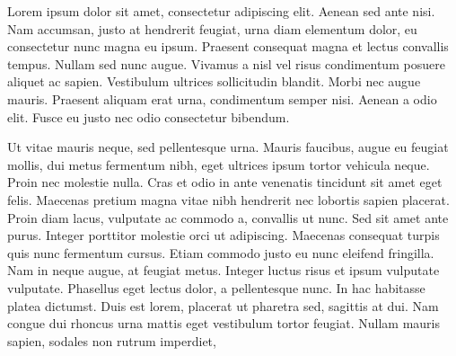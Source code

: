 \documentclass{minimal}
\begin{document}

Lorem ipsum dolor sit amet, consectetur adipiscing elit. Aenean sed ante nisi.
Nam accumsan, justo at hendrerit feugiat, urna diam elementum dolor, eu
consectetur nunc magna eu ipsum. Praesent consequat magna et lectus convallis
tempus. Nullam sed nunc augue. Vivamus a nisl vel risus condimentum posuere
aliquet ac sapien. Vestibulum ultrices sollicitudin blandit. Morbi nec augue
mauris. Praesent aliquam erat urna, condimentum semper nisi. Aenean a odio
elit. Fusce eu justo nec odio consectetur bibendum.

\renewcommand{\baselinestretch}{1.50}\normalsize

Ut vitae mauris neque, sed pellentesque urna. Mauris faucibus, augue eu
feugiat mollis, dui metus fermentum nibh, eget ultrices ipsum tortor
vehicula neque. Proin nec molestie nulla. Cras et odio in ante venenatis
tincidunt sit amet eget felis. Maecenas pretium magna vitae nibh hendrerit
nec lobortis sapien placerat. Proin diam lacus, vulputate ac commodo a,
convallis ut nunc. Sed sit amet ante purus. Integer porttitor molestie orci
ut adipiscing. Maecenas consequat turpis quis nunc fermentum cursus. Etiam
commodo justo eu nunc eleifend fringilla. Nam in neque augue, at feugiat metus.
Integer luctus risus et ipsum vulputate vulputate. Phasellus eget lectus dolor,
a pellentesque nunc. In hac habitasse platea dictumst. Duis est lorem, placerat
ut pharetra sed, sagittis at dui. Nam congue dui rhoncus urna mattis eget
vestibulum tortor feugiat. Nullam mauris sapien, sodales non rutrum imperdiet,


%
%
%
\end{document}
